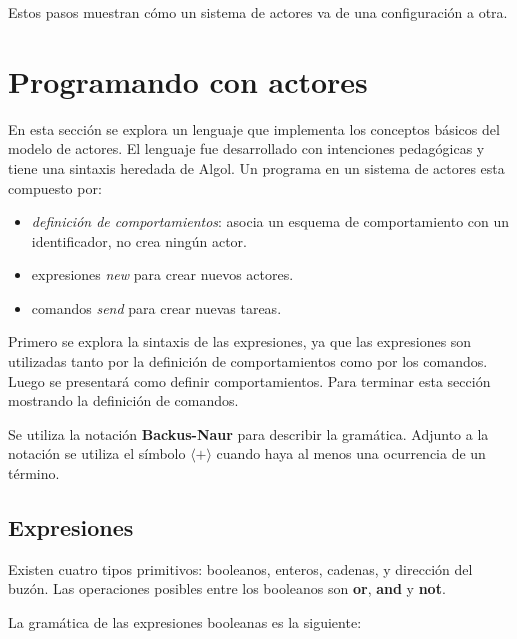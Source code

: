 Estos pasos muestran cómo un sistema de actores va de una configuración a otra. 

\section{Programando con actores}\label{actores:sal}
En esta sección se explora un lenguaje que implementa los conceptos básicos del modelo de actores. El lenguaje \SAL fue desarrollado con intenciones pedagógicas y tiene una sintaxis heredada de Algol. Un programa \SAL en un sistema de actores esta compuesto por:

\begin{itemize}
 \item \textit{definición de comportamientos}: asocia un esquema de comportamiento con un identificador, no crea ningún actor.
 \item expresiones \textit{new} para crear nuevos actores.
 \item comandos \textit{send} para crear nuevas tareas.
\end{itemize}

Primero se explora la sintaxis de las expresiones, ya que las expresiones son utilizadas tanto por la definición de comportamientos como por los comandos. Luego se presentará como definir comportamientos. Para terminar esta sección mostrando la definición de comandos.


Se utiliza la notación \textbf{Backus-Naur}\cite{McCracken:2003:BF:1074100.1074155} para describir la gramática. Adjunto a la notación se utiliza el símbolo $\langle \textbf{+} \rangle$ cuando haya al menos una ocurrencia de un término.

\subsection{Expresiones}\label{actores:exp}
Existen cuatro tipos primitivos: booleanos, enteros, cadenas, y dirección del buzón. Las operaciones posibles entre los booleanos son \textbf{or}, \textbf{and} y \textbf{not}.

La gramática de las expresiones booleanas es la siguiente:

